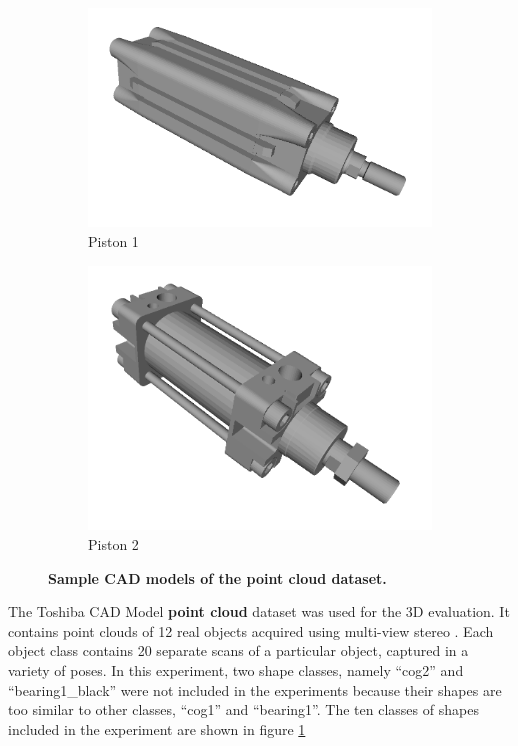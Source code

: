 \begin{figure}[t]
\begin{subfigure}[b]{0.16\linewidth}
		\includegraphics[width=1\linewidth]{./fig/eval/toshiba_piston1.png}
		\caption{Piston 1}
	\end{subfigure}
	\begin{subfigure}[b]{0.16\linewidth} \centering
		\includegraphics[width=1\linewidth]{./fig/eval/toshiba_piston2.png}
		\caption{Piston 2}
	\end{subfigure}
	\caption{\textbf{Sample CAD models of the \textbf{point cloud} dataset.}}
	\label{fig/reg/toshiba}
\end{figure}

The Toshiba CAD Model \textbf{point cloud} dataset \cite{Ltd.2011} was used for the 3D evaluation. It contains point clouds of 12 real objects acquired using multi-view stereo \cite{Vogiatzis2011}. Each object class contains 20 separate scans of a particular object, captured in a variety of poses. In this experiment, two shape classes, namely ``cog2'' and ``bearing1\_black'' were not included in the experiments because their shapes are too similar to other classes, \ie ``cog1'' and ``bearing1''. The ten classes of shapes included in the experiment are shown in figure \ref{fig/reg/toshiba} 

